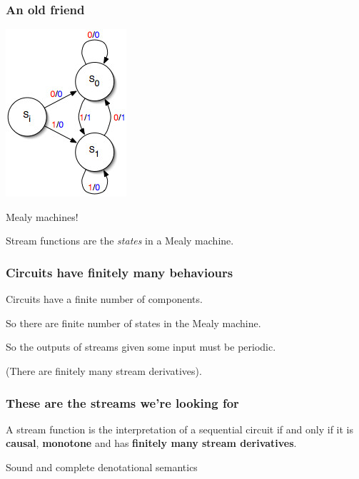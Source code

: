 \begin{frame}
    \frametitle{An old friend}

    \Large

    \begin{center}
        \includegraphics[scale=0.5]{imgs/mealy-machine}

        Mealy machines!

        \await

        \normalsize
        Stream functions are the \emph{states} in a Mealy machine.
    \end{center}

\end{frame}
\begin{frame}
    \frametitle{Circuits have finitely many behaviours}

    Circuits have a finite number of components.

    \await

    So there are finite number of states in the Mealy machine.

    \await

    So the outputs of streams given some input must be \alert{periodic}.

    \await

    (There are finitely many \alert{stream derivatives}).
\end{frame}
\begin{frame}
    \frametitle{These are the streams we're looking for}

    \begin{theorem}
        A stream function is the interpretation of a sequential circuit
        if and only if it is \textbf{causal}, \textbf{monotone} and has
        \textbf{finitely many stream derivatives}.
    \end{theorem}

    \LARGE
    Sound and complete
    \alert{denotational semantics}
\end{frame}